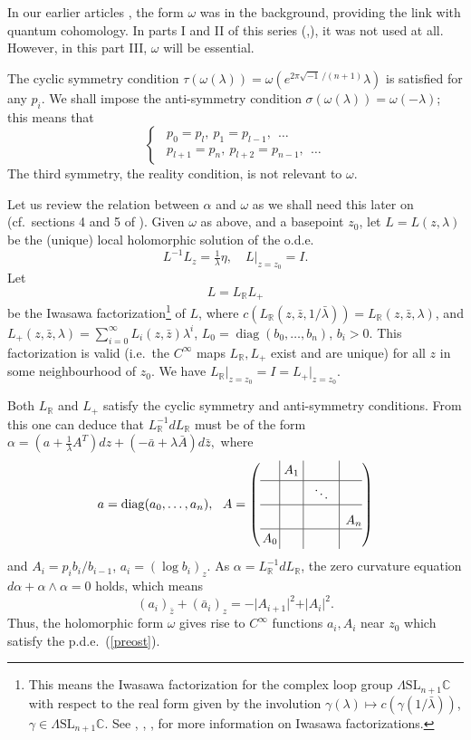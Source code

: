 \documentclass[a4paper,12pt,leqno]{amsart}
\numberwithin{equation}{section}
\theoremstyle{plain}
\theoremstyle{definition}
\newcommand{\C}{\mathbb C}
\newcommand{\R}{\mathbb R}
\newcommand{\al}{\alpha}
\newcommand{\ga}{\gamma}
\newcommand{\la}{\lambda}
\newcommand{\si}{\sigma}
\newcommand{\La}{\Lambda}
\newcommand{\om}{\omega}
\DeclareMathOperator{\diag}{diag}
\newcommand{\SL}{\textrm{SL}}
\newcommand{\zbar}{  {\bar z}  }
\renewcommand{\i}{ {\scriptscriptstyle\sqrt{-1}}\, }
\begin{document}
In our earlier articles \cite{GuLi14},\cite{GuLi12} the form $\om$ was in the background, providing the link with quantum cohomology.  In parts I and II  of this series (\cite{GuItLiXX},\cite{GuItLi15}),  it was not used at all.  However, in this part III, $\om$ will be essential.  

The cyclic symmetry condition  $\tau(\om(\la))=\om(e^{{2\pi \i}/{(n+1)}} \la)$ is satisfied for any $p_i$. We shall impose the anti-symmetry condition $\si(\om(\la))=\om(-\la)$; this means that
\begin{equation*}
\begin{cases}
\ \  p_0=p_l, \ p_1=p_{l-1},\ \ \dots\\
\ \  p_{l+1}=p_n, \ p_{l+2}=p_{n-1},\ \ \dots
 \end{cases}
\end{equation*}
The third symmetry, the reality condition, is not relevant to $\om$.

Let us review the relation between $\al$ and $\om$ as we shall need this later on (cf.\ sections 4 and 5 of \cite{GuLi14}).  Given $\om$ as above, and a basepoint $z_0$, let $L=L(z,\la)$ be the (unique) local holomorphic solution of the o.d.e.\ 
\[
L^{-1}L_z=\tfrac1\la \eta,\quad L\vert_{z=z_0}=I.
\]
Let
\[
L=L_\R L_+
\]
be the  Iwasawa factorization\footnote{This means the Iwasawa factorization for the complex loop group
$\La \SL_{n+1}\C$
with respect to the real form given by the involution 
$\ga(\la)\mapsto c(\ga(1/{\bar\la}))$, $\ga\in \La \SL_{n+1}\C$. See \cite{PrSe86}, \cite{Gu97}, \cite{BaDo01}, \cite{Ke99} for more information on Iwasawa factorizations.}
of $L$, where 
$c(L_\R(z,\zbar,1/{\bar\la}))=L_\R(z,\zbar,\la)$, and
$L_+(z,\zbar,\la)=\sum_{i=0}^\infty L_i(z,\zbar) \la^i$, $L_0=\diag(b_0,\dots,b_n)$, $b_i>0$.
This factorization is valid (i.e.\ the $C^\infty$ maps $L_\R,L_+$ exist and are unique) for all $z$ in some neighbourhood of $z_0$.  
We have $L_\R\vert_{z=z_0}=I=L_+\vert_{z=z_0}$.  

Both $L_\R$ and $L_+$ satisfy the cyclic symmetry and anti-symmetry conditions. 
From this one can deduce that $L_\R^{-1} dL_\R$ must be of the form
$
\al = (a+\tfrac1\la A^T)dz + (-\bar a+\la \bar A)d\zbar,
$
where
 \[
 a=\diag(a_0,\dots,a_n),\ \ 
 A=
 \left(
\begin{array}{c|c|c|c}
\vphantom{(w_0)_{(w_0)}^{(w_0)}}
 & \! A_1 \! & &  
 \\
\hline
  &  & \  \ddots\   & \\
\hline
\vphantom{\ddots}
  & &  & A_{n}\!\!\!
\\
\hline
\vphantom{(w_0)_{(w_0)}^{(w_0)}}
\!\! A_0 \!\!  & &  &  \!
\end{array}
\right)
\]
and
$A_i=p_i b_i/b_{i-1}$,  $a_i=(\log b_i)_z$.  As $\al=L_\R^{-1}dL_\R$, the zero curvature equation $d\al+\al\wedge\al=0$ holds, which means
\begin{equation}\label{preost}
(a_i)_{\zbar} + (\bar a_i)_z
 = -\vert A_{i+1}\vert^2 + \vert A_{i}\vert^2.
\end{equation}
Thus, the holomorphic form $\om$ gives rise to $C^\infty$ functions $a_i,A_i$ near $z_0$ which satisfy the p.d.e.\ (\ref{preost}).
\end{document}
